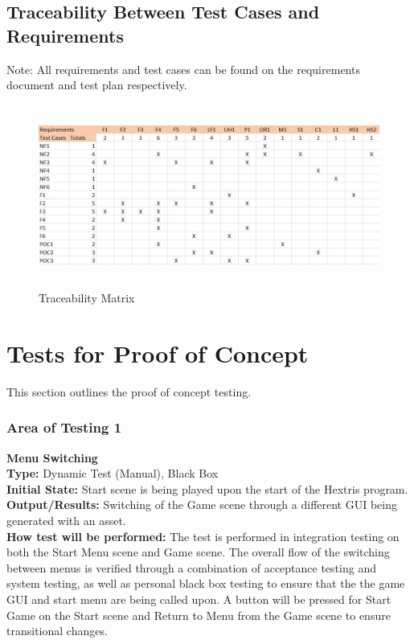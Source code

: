 \documentclass[12pt, titlepage]{article}
\begin{document}
\subsection{Traceability Between Test Cases and Requirements}
\noindent Note: All requirements and test cases can be found on the requirements document and test plan respectively.
\begin{figure}[h!]
\centering
\includegraphics[width = 14cm, height = 6cm]{TraceabilityMatrix}
\caption{Traceability Matrix}
\end{figure}

\section{Tests for Proof of Concept}
\noindent This section outlines the proof of concept testing.
\subsubsection{Area of Testing 1}
\noindent \textbf{Menu Switching}\\
\textbf{Type:} Dynamic Test (Manual), Black Box \\
\textbf{Initial State:} Start scene is being played upon the start of the Hextris program.\\
\textbf{Output/Results:} Switching of the Game scene through a different GUI being generated with an asset. \\
\textbf{How test will be performed:} The test is performed in integration testing on both the Start Menu scene and Game scene. The overall flow of the switching between menus is verified through a combination of acceptance testing and system testing, as well as personal black box testing to ensure that the the game GUI and start menu are being called upon. A button will be pressed for Start Game on the Start scene and Return to Menu from the Game scene to ensure transitional changes. 
\end{document}
